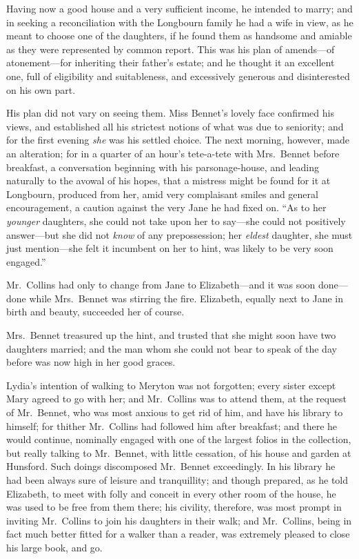 \documentclass[12pt,english]{book}
\begin{document}
Having now a good house and a very sufficient income, he intended
to marry; and in seeking a reconciliation with the Longbourn family
he had a wife in view, as he meant to choose one of the daughters,
if he found them as handsome and amiable as they were represented
by common report. This was his plan of amends\mbox{---}of atonement\mbox{---}for
inheriting their father's estate; and he thought it an excellent one,
full of eligibility and suitableness, and excessively generous and
disinterested on his own part.

His plan did not vary on seeing them. Miss Bennet's lovely face confirmed
his views, and established all his strictest notions of what was due
to seniority; and for the first evening \textit{she} was his settled
choice. The next morning, however, made an alteration; for in a quarter
of an hour's tete-a-tete with Mrs.\ Bennet before breakfast, a conversation
beginning with his parsonage-house, and leading naturally to the avowal
of his hopes, that a mistress might be found for it at Longbourn,
produced from her, amid very complaisant smiles and general encouragement,
a caution against the very Jane he had fixed on. {}``As to her \textit{younger}
daughters, she could not take upon her to say\mbox{---}she could
not positively answer\mbox{---}but she did not \textit{know} of any
prepossession; her \textit{eldest} daughter, she must just mention\mbox{---}she
felt it incumbent on her to hint, was likely to be very soon engaged.''

Mr.\ Collins had only to change from Jane to Elizabeth\mbox{---}and
it was soon done\mbox{---}done while Mrs.\ Bennet was stirring the
fire. Elizabeth, equally next to Jane in birth and beauty, succeeded
her of course.

Mrs.\ Bennet treasured up the hint, and trusted that she might soon
have two daughters married; and the man whom she could not bear to
speak of the day before was now high in her good graces.

Lydia's intention of walking to Meryton was not forgotten; every sister
except Mary agreed to go with her; and Mr.\ Collins was to attend
them, at the request of Mr.\ Bennet, who was most anxious to get
rid of him, and have his library to himself; for thither Mr.\ Collins
had followed him after breakfast; and there he would continue, nominally
engaged with one of the largest folios in the collection, but really
talking to Mr.\ Bennet, with little cessation, of his house and garden
at Hunsford. Such doings discomposed Mr.\ Bennet exceedingly. In
his library he had been always sure of leisure and tranquillity; and
though prepared, as he told Elizabeth, to meet with folly and conceit
in every other room of the house, he was used to be free from them
there; his civility, therefore, was most prompt in inviting Mr.\ Collins
to join his daughters in their walk; and Mr.\ Collins, being in fact
much better fitted for a walker than a reader, was extremely pleased
to close his large book, and go.
\end{document}

